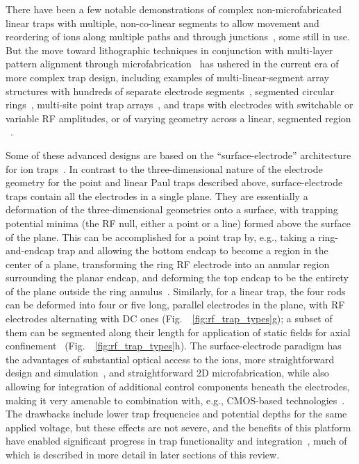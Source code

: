 \documentclass[%
reprint,
 amsmath,amssymb,
]{revtex4-1}
\begin{document}
There have been a few notable demonstrations of complex non-microfabricated linear traps with multiple, non-co-linear segments to allow movement and reordering of ions along multiple paths and through junctions~\cite{HensingerTJunction2006,blakestad_junction_2009}, some still in use.  But the move toward lithographic techniques in conjunction with multi-layer pattern alignment through microfabrication~\cite{Stick2005,NIST:SET:PRL:06} has ushered in the current era of more complex trap design, including examples of multi-linear-segment array structures with hundreds of separate electrode segments~\cite{amini_racetrack}, segmented circular rings~\cite{PhysRevApplied.4.031001}, multi-site point trap arrays~\cite{Sterling2014,BruzewiczArrayLoading2016,kumph_array,Mielenz2016}, and traps with electrodes with switchable or variable RF amplitudes, or of varying geometry across a linear, segmented region ~\cite{KimIntFiberTrap2011,kumph_array,PhysRevLett.120.023201,PhysRevA.97.020302_2018}.

Some of these advanced designs are based on the ``surface-electrode'' architecture for ion traps~\cite{NIST:SET:QIC:05}.  In contrast to the three-dimensional nature of the electrode geometry for the point and linear Paul traps described above, surface-electrode traps contain all the electrodes in a single plane.  They are essentially a deformation of the three-dimensional geometries onto a surface, with trapping potential minima (the RF null, either a point or a line) formed above the surface of the plane.  This can be accomplished for a point trap by, e.g., taking a ring-and-endcap trap and allowing the bottom endcap to become a region in the center of a plane, transforming the ring RF electrode into an annular region surrounding the planar endcap, and deforming the top endcap to be the entirety of the plane outside the ring annulus~\cite{PhysRevA.78.063410}.  Similarly, for a linear trap, the four rods can be deformed into four or five long, parallel electrodes in the plane, with RF electrodes alternating with DC ones (Fig.~~\ref{fig:rf_trap_types}g); a subset of them can be segmented along their length for application of static fields for axial confinement~\cite{NIST:SET:QIC:05} (Fig.~~\ref{fig:rf_trap_types}h).  The surface-electrode paradigm has the advantages of substantial optical access to the ions, more straightforward design and simulation~\cite{PhysRevA.78.033402,PhysRevA.78.063410,PhysRevLett.102.233002_2009,Hong2016}, and straightforward 2D microfabrication, while also allowing for integration of additional control components beneath the electrodes, making it very amenable to combination with, e.g., CMOS-based technologies~\cite{mehta_cmos_2014}.  The drawbacks include lower trap frequencies and potential depths for the same applied voltage, but these effects are not severe, and the benefits of this platform have enabled significant progress in trap functionality and integration~\cite{VanDevenderFiberTrap2010,sandia_junction_2011,KimIntFiberTrap2011,Allcock2012,oxford_muwave_trap_2013,MehtaIntegrated2016,kim_group_mirror_2016,Willitsch_group_junctions_2017,Ghadimi2017}, much of which is described in more detail in later sections of this review.
\end{document}

